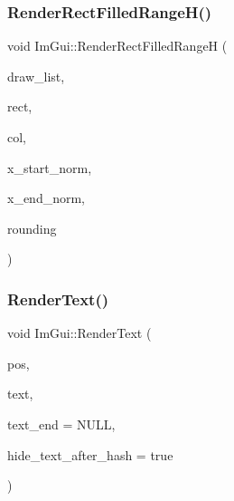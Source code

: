 \subsubsection{\texorpdfstring{Render\+Rect\+Filled\+Range\+H()}{RenderRectFilledRangeH()}}
{\footnotesize\ttfamily void Im\+Gui\+::\+Render\+Rect\+Filled\+RangeH (\begin{DoxyParamCaption}\item[{\hyperlink{struct_im_draw_list}{Im\+Draw\+List} $\ast$}]{draw\+\_\+list,  }\item[{const \hyperlink{struct_im_rect}{Im\+Rect} \&}]{rect,  }\item[{Im\+U32}]{col,  }\item[{float}]{x\+\_\+start\+\_\+norm,  }\item[{float}]{x\+\_\+end\+\_\+norm,  }\item[{float}]{rounding }\end{DoxyParamCaption})}

\hypertarget{namespace_im_gui_a9971ce57f2a288ac3a12df886c5550d1}{}\label{namespace_im_gui_a9971ce57f2a288ac3a12df886c5550d1} 
\subsubsection{\texorpdfstring{Render\+Text()}{RenderText()}}
{\footnotesize\ttfamily void Im\+Gui\+::\+Render\+Text (\begin{DoxyParamCaption}\item[{\hyperlink{struct_im_vec2}{Im\+Vec2}}]{pos,  }\item[{const char $\ast$}]{text,  }\item[{const char $\ast$}]{text\+\_\+end = {\ttfamily NULL},  }\item[{bool}]{hide\+\_\+text\+\_\+after\+\_\+hash = {\ttfamily true} }\end{DoxyParamCaption})}

\hypertarget{namespace_im_gui_ab362eafae794c7364a6b96ea06f38eb9}{}\label{namespace_im_gui_ab362eafae794c7364a6b96ea06f38eb9} 
